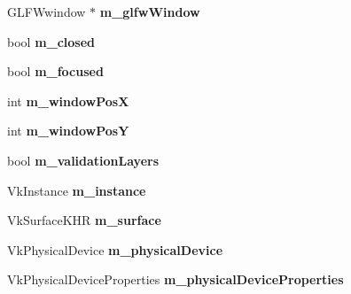 \begin{DoxyCompactItemize}
\item 
\mbox{\label{class_flounder_1_1_display_a017894844d4e8ebad837e4b9f75a7fc1}} 
G\+L\+F\+Wwindow $\ast$ {\bfseries m\+\_\+glfw\+Window}
\item 
\mbox{\label{class_flounder_1_1_display_a278c35dd3f940edb8ebd54e2f44408b7}} 
bool {\bfseries m\+\_\+closed}
\item 
\mbox{\label{class_flounder_1_1_display_a1788cc11a87df44de01a3cd195cad8ea}} 
bool {\bfseries m\+\_\+focused}
\item 
\mbox{\label{class_flounder_1_1_display_a3afa9083e7ed2fe6b1fe265cdf5974d7}} 
int {\bfseries m\+\_\+window\+PosX}
\item 
\mbox{\label{class_flounder_1_1_display_a88b8b404a7752e3fd56ae11d63eefe41}} 
int {\bfseries m\+\_\+window\+PosY}
\item 
\mbox{\label{class_flounder_1_1_display_aa0c72f0fbac00e5a9a0b279ef072a903}} 
bool {\bfseries m\+\_\+validation\+Layers}
\item 
\mbox{\label{class_flounder_1_1_display_acb679dadfa2630102401bfcbdd27abb6}} 
Vk\+Instance {\bfseries m\+\_\+instance}
\item 
\mbox{\label{class_flounder_1_1_display_a909966c412b5097a997694c78c37bdbc}} 
Vk\+Surface\+K\+HR {\bfseries m\+\_\+surface}
\item 
\mbox{\label{class_flounder_1_1_display_a9e57824547f2e88ff3fda4d01650adaf}} 
Vk\+Physical\+Device {\bfseries m\+\_\+physical\+Device}
\item 
\mbox{\label{class_flounder_1_1_display_af333cb0513f834c0491b0ef22cf2c358}} 
Vk\+Physical\+Device\+Properties {\bfseries m\+\_\+physical\+Device\+Properties}
\item 
\mbox{\label{class_flounder_1_1_display_a4e4637477d87e86291b4622922dd0e50}} 

\end{DoxyCompactItemize}
